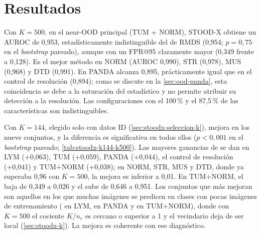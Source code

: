 
\section{Resultados}\label{sec:stoodx-resultados}

Con $K = 500$, en el near-OOD principal (TUM + NORM), STOOD-X obtiene un AUROC de 0,953, estadísticamente indistinguible del de RMDS (0,954; $p = 0{,}75$ en el \emph{bootstrap} pareado), aunque con un FPR@95 claramente mayor (0,349 frente a 0,128). Es el mejor método en NORM (AUROC 0,990), STR (0,978), MUS (0,968) y DTD (0,991). En PANDA alcanza 0,895, prácticamente igual que en el control de resolución (0,894); como se discute en la \cref{sec:ood-panda}, esta coincidencia se debe a la saturación del estadístico y no permite atribuir su detección a la resolución. Las configuraciones con el 100\,\% y el 87,5\,\% de las características son indistinguibles.





Con $K = 144$, elegido solo con datos ID (\cref{sec:stoodx-seleccion-k}), \stoodx mejora en los nueve conjuntos, y la diferencia es significativa en todos ellos ($p < 0{,}001$ en el \emph{bootstrap} pareado; \cref{tab:stoodx-k144-k500}). Las mayores ganancias de \AUROC se dan en LYM (+0,063), TUM (+0,059), PANDA (+0,044), el control de resolución (+0,041) y TUM+NORM (+0,038); en NORM, STR, MUS y DTD, donde ya superaba 0,96 con $K = 500$, la mejora es inferior a 0,01. En TUM+NORM, el  baja de 0,349 a 0,026 y el  sube de 0,646 a 0,951. Los conjuntos que más mejoran son aquellos en los que muchas imágenes se predicen en clases con pocas imágenes de entrenamiento ( en LYM,  en PANDA y  en TUM+NORM), donde con $K = 500$ el cociente $K/n_c$ es cercano o superior a 1 y el vecindario deja de ser local (\cref{sec:stoodx-k}). La mejora es coherente con ese diagnóstico.

